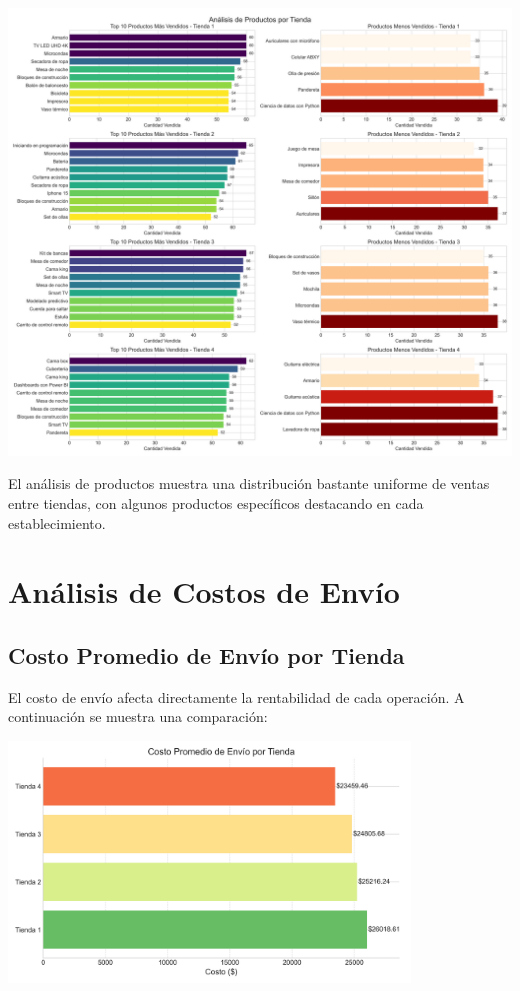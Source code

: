 \documentclass[12pt,a4paper]{report}\usepackage[spanish]{babel}\usepackage[utf8]{inputenc}\usepackage{graphicx}\usepackage{geometry}\usepackage{xcolor}\usepackage{tikz}\usepackage{pgfplots}\usepackage{booktabs}\usepackage{multicol}\usepackage{hyperref}\usepackage{pgf-pie}
\begin{document}
\begin{center}
\includegraphics[width=\textwidth]{4_productos_vendidos.png}
\end{center}

El análisis de productos muestra una distribución bastante uniforme de ventas entre tiendas, con algunos productos específicos destacando en cada establecimiento.

\chapter{Análisis de Costos de Envío}

\section{Costo Promedio de Envío por Tienda}

El costo de envío afecta directamente la rentabilidad de cada operación. A continuación se muestra una comparación:

\begin{center}
\includegraphics[width=0.8\textwidth]{5_costo_envio.png}
\end{center}
\end{document}
